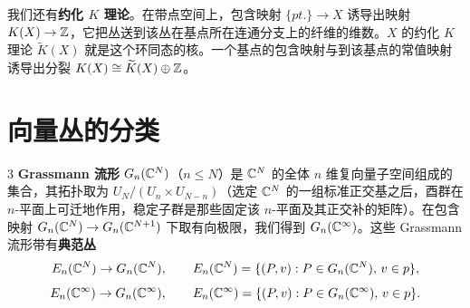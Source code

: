 \begin{itemize}[leftmargin=1.6em,itemsep=2pt]
\end{itemize}

我们还有\textbf{约化 $K$ 理论}。在带点空间上，包含映射 $\{pt.\}\to X$ 诱导出映射 $K(X)\to\mathbb{Z}$，它把丛送到该丛在基点所在连通分支上的纤维的维数。$X$ 的约化 $K$ 理论 $\widetilde{K}(X)$ 就是这个环同态的核。一个基点的包含映射与到该基点的常值映射诱导出分裂 $K(X)\cong\widetilde{K}(X)\oplus\mathbb{Z}$。

\section{向量丛的分类}

\begin{defn}{3} \textbf{Grassmann 流形} $G_n(\mathbb{C}^N)$（$n\le N$）是 $\mathbb{C}^N$ 的全体 $n$ 维复向量子空间组成的集合，其拓扑取为 $U_N/(U_n\times U_{N-n})$（选定 $\mathbb{C}^N$ 的一组标准正交基之后，酉群在 $n$-平面上可迁地作用，稳定子群是那些固定该 $n$-平面及其正交补的矩阵）。在包含映射 $G_n(\mathbb{C}^N)\to G_n(\mathbb{C}^{N+1})$ 下取有向极限，我们得到 $G_n(\mathbb{C}^\infty)$。这些 Grassmann 流形带有\textbf{典范丛}
\[
E_n(\mathbb{C}^N)\to G_n(\mathbb{C}^N),\qquad E_n(\mathbb{C}^N)=\{(P,v):P\in G_n(\mathbb{C}^N),\,v\in p\},
\]
\[
E_n(\mathbb{C}^\infty)\to G_n(\mathbb{C}^\infty),\qquad E_n(\mathbb{C}^\infty)=\{(P,v):P\in G_n(\mathbb{C}^\infty),\,v\in p\}.
\]
\end{defn}

